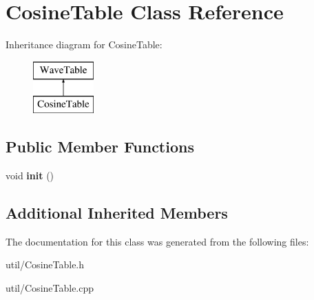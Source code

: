 \hypertarget{classCosineTable}{}\section{Cosine\+Table Class Reference}
\label{classCosineTable}
Inheritance diagram for Cosine\+Table\+:\begin{figure}[H]
\begin{center}
\leavevmode
\includegraphics[height=2.000000cm]{classCosineTable}
\end{center}
\end{figure}
\subsection*{Public Member Functions}
\begin{DoxyCompactItemize}
\item 
void {\bfseries init} ()\hypertarget{classCosineTable_aa44f664688eca2ff8de26b2ee5d78785}{}\label{classCosineTable_aa44f664688eca2ff8de26b2ee5d78785}

\end{DoxyCompactItemize}
\subsection*{Additional Inherited Members}


The documentation for this class was generated from the following files\+:\begin{DoxyCompactItemize}
\item 
util/Cosine\+Table.\+h\item 
util/Cosine\+Table.\+cpp\end{DoxyCompactItemize}

